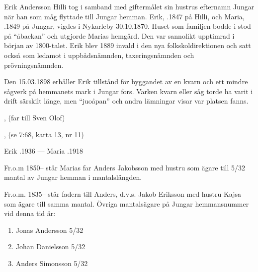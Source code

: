 %
Erik Andersson Hilli tog i samband med giftermålet sin hustrus efternamn Jungar när han som måg flyttade till Jungar hemman. Erik, .1847 på Hilli, och Maria, .1849 på Jungar, vigdes i Nykarleby 30.10.1870. Huset som familjen bodde i stod på ``åbackan'' och utgjorde Marias hemgård. Den var sannolikt upptimrad i början av 1800-talet. Erik blev 1889 invald i den nya folkskoldirektionen och satt också som ledamot i uppbådsnämnden, taxeringsnämnden och prövningsnämnden.

Den 15.03.1898 erhåller Erik tillstånd för byggandet av en kvarn och ett mindre sågverk på hemmanets mark i Jungar fors. Varken kvarn eller såg torde ha varit i drift särskilt länge, men ``juoåpan'' och andra lämningar visar var platsen fanns.
\begin{jhchildren}
  \item {}
  \item {}
  \item {}, (far till Sven Olof)
  \item {}, (se 7:68, karta 13, nr 11)
  \item {}
  \item {}
\end{jhchildren}

Erik .1936  ---  Maria .1918

Fr.o.m 1850-- står Marias far Anders Jakobsson med hustru som ägare till 5/32 mantal av Jungar hemman i mantalslängden.

Fr.o.m. 1835-- står fadern till Anders, d.v.s. Jakob Eriksson med hustru Kajsa som ägare till samma mantal. Övriga mantalsägare på Jungar hemmansnummer vid denna tid är:
\begin{enumerate}
  \item Jonas Andersson 5/32
  \item Johan Danielsson 5/32
  \item Anders Simonsson 5/32
\end{enumerate}

